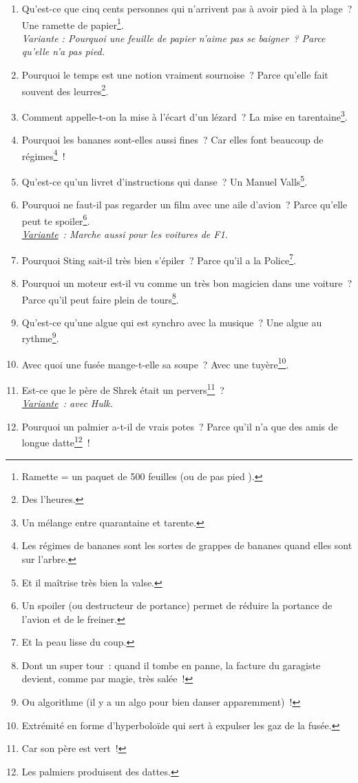 \documentclass[10pt,a5paper,fullpage]{book}
\begin{document}
\begin{enumerate}
		\item Qu’est-ce que cinq cents personnes qui n’arrivent pas à avoir pied à la plage~? Une ramette de papier\footnote{Ramette = un paquet de 500 feuilles (ou de \guillemotleft pas pied \guillemotright).}.
		\\\textit{Variante : Pourquoi une feuille de papier n’aime pas se baigner~? Parce qu’elle n’a pas pied.}
		\item Pourquoi le temps est une notion vraiment sournoise~? Parce qu’elle fait souvent des leurres\footnote{Des l'heures.}.
		\item Comment appelle-t-on la mise à l’écart d’un lézard~? La mise en tarentaine\footnote{Un mélange entre quarantaine et tarente.}.
		\item Pourquoi les bananes sont-elles aussi fines~? Car elles font beaucoup de régimes\footnote{Les régimes de bananes sont les sortes de grappes de bananes quand elles sont sur l'arbre.}~!
		\item Qu’est-ce qu’un livret d’instructions qui danse~? Un Manuel Valls\footnote{Et il maîtrise très bien la valse.}.
		\item Pourquoi ne faut-il pas regarder un film avec une aile d’avion~? Parce qu’elle peut te spoiler\footnote{Un spoiler (ou destructeur de portance) permet de réduire la portance de l'avion et de le freiner.}. \\\textit{\underline{Variante}~: Marche aussi pour les voitures de F1.}
		\item Pourquoi Sting sait-il très bien s’épiler~? Parce qu’il a la Police\footnote{Et la peau lisse du coup.}. 
		\item Pourquoi un moteur est-il vu comme un très bon magicien dans une voiture~? Parce qu'il peut faire plein de tours\footnote{Dont un super tour~: quand il tombe en panne, la facture du garagiste devient, comme par magie, très salée~!}.
		\item Qu’est-ce qu’une algue qui est synchro avec la musique~? Une algue au rythme\footnote{Ou algorithme (il y a un algo pour bien danser apparemment)~!}.
		\item Avec quoi une fusée mange-t-elle sa soupe~? Avec une tuyère\footnote{Extrémité en forme d’hyperboloïde qui sert à expulser les gaz de la fusée.}.
		\item Est-ce que le père de Shrek était un pervers\footnote{Car son père est vert~!}~? \\\textit{\underline{Variante}~: avec Hulk.}
		\item Pourquoi un palmier a-t-il de vrais potes~? Parce qu’il n’a que des amis de longue datte\footnote{Les palmiers produisent des dattes.}~!

\end{enumerate}
\end{document}

